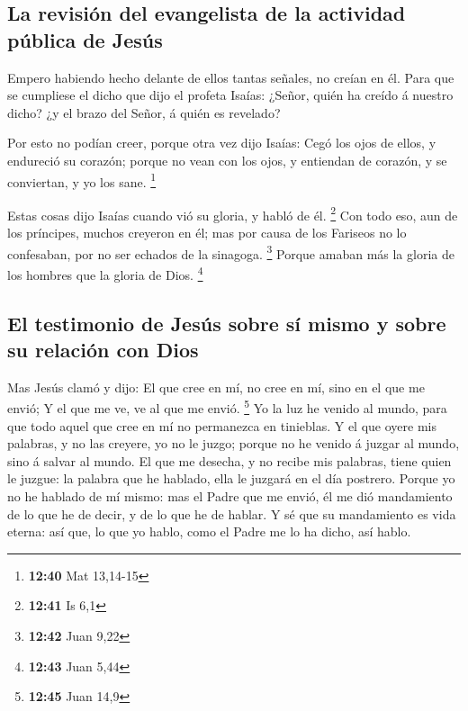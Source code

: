 \hypertarget{la-revisiuxf3n-del-evangelista-de-la-actividad-puxfablica-de-jesuxfas}{%
\subsection{La revisión del evangelista de la actividad pública de
Jesús}\label{la-revisiuxf3n-del-evangelista-de-la-actividad-puxfablica-de-jesuxfas}}

 Empero habiendo hecho delante de ellos tantas señales, no
creían en él.  Para que se cumpliese el dicho que dijo el
profeta Isaías: ¿Señor, quién ha creído á nuestro dicho? ¿y el brazo del
Señor, á quién es revelado?

 Por esto no podían creer, porque otra vez dijo Isaías:
 Cegó los ojos de ellos, y endureció su corazón; porque no
vean con los ojos, y entiendan de corazón, y se conviertan, y yo los
sane. \footnote{\textbf{12:40} Mat 13,14-15}

 Estas cosas dijo Isaías cuando vió su gloria, y habló de
él. \footnote{\textbf{12:41} Is 6,1}  Con todo eso, aun de
los príncipes, muchos creyeron en él; mas por causa de los Fariseos no
lo confesaban, por no ser echados de la sinagoga. \footnote{\textbf{12:42}
  Juan 9,22}  Porque amaban más la gloria de los hombres
que la gloria de Dios. \footnote{\textbf{12:43} Juan 5,44}

\hypertarget{el-testimonio-de-jesuxfas-sobre-suxed-mismo-y-sobre-su-relaciuxf3n-con-dios}{%
\subsection{El testimonio de Jesús sobre sí mismo y sobre su relación
con
Dios}\label{el-testimonio-de-jesuxfas-sobre-suxed-mismo-y-sobre-su-relaciuxf3n-con-dios}}

 Mas Jesús clamó y dijo: El que cree en mí, no cree en mí,
sino en el que me envió;  Y el que me ve, ve al que me
envió. \footnote{\textbf{12:45} Juan 14,9}  Yo la luz he
venido al mundo, para que todo aquel que cree en mí no permanezca en
tinieblas.  Y el que oyere mis palabras, y no las creyere,
yo no le juzgo; porque no he venido á juzgar al mundo, sino á salvar al
mundo.  El que me desecha, y no recibe mis palabras, tiene
quien le juzgue: la palabra que he hablado, ella le juzgará en el día
postrero.  Porque yo no he hablado de mí mismo: mas el
Padre que me envió, él me dió mandamiento de lo que he de decir, y de lo
que he de hablar.  Y sé que su mandamiento es vida eterna:
así que, lo que yo hablo, como el Padre me lo ha dicho, así hablo.

